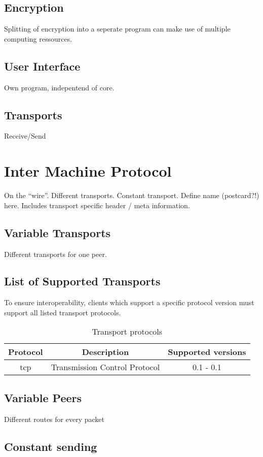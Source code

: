 \subsection{Encryption}
Splitting of encryption into a seperate program can make use of
multiple computing ressources.
\subsection{User Interface}
Own program, indepentend of core.
\subsection{Transports}
Receive/Send

\section{Inter Machine Protocol}
On the "`wire"'. Different transports. Constant transport.
Define name (postcard?!) here. Includes transport specific
header / meta information.

\subsection{Variable Transports}
Different transports for one peer.
\subsection{List of Supported Transports}
To ensure interoperability, clients which support a specific
protocol version must support all listed transport protocols.
\begin{longtable}{|c|c|c|}
\caption{Transport protocols}\\
\hline
\textbf{Protocol} & \textbf{Description} & \textbf{Supported versions}\\
\hline
tcp & Transmission Control Protocol & 0.1 - 0.1\\
\hline
\end{longtable}

\subsection{Variable Peers}
Different routes for every packet
\subsection{Constant sending}

